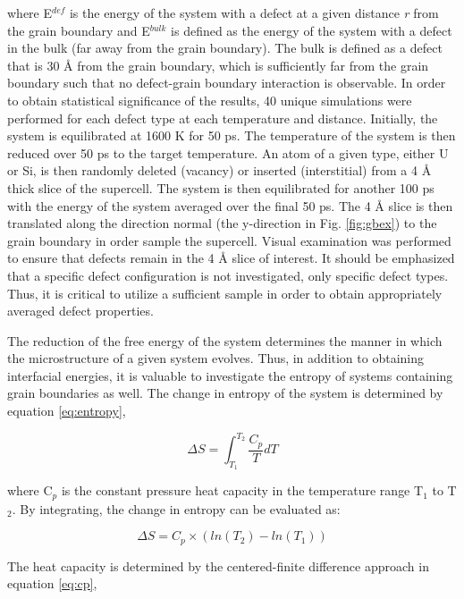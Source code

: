 \documentclass[review]{elsarticle}
\begin{document}
where E$^{def}$ is the energy of the system with a defect at a given distance \textit{r} from the grain boundary and E$^{bulk}$ is defined as the energy of the system with a defect in the bulk (far away from the grain boundary). The bulk is defined as a defect that is 30 {\AA} from the grain boundary, which is sufficiently far from the grain boundary such that no defect-grain boundary interaction is observable. In order to obtain statistical significance of the results, 40 unique simulations were performed for each defect type at each temperature and distance. Initially, the system is equilibrated at 1600 K for 50 ps. The temperature of the system is then reduced over 50 ps to the target temperature. An atom of a given type, either U or Si, is then randomly deleted (vacancy) or inserted (interstitial) from a 4 {\AA} thick slice of the supercell. The system is then equilibrated for another 100 ps with the energy of the system averaged over the final 50 ps. The 4 {\AA} slice is then translated along the direction normal (the y-direction in Fig. \ref{fig:gbex}) to the grain boundary in order sample the supercell. Visual examination was performed to ensure that defects remain in the 4 {\AA} slice of interest. It should be emphasized that a specific defect configuration is not investigated, only specific defect types. Thus, it is critical to utilize a sufficient sample in order to obtain appropriately averaged defect properties.

The reduction of the free energy of the system determines the manner in which the microstructure of a given system evolves. Thus, in addition to obtaining interfacial energies, it is valuable to investigate the entropy of systems containing grain boundaries as well. The change in entropy of the system is determined by equation \ref{eq:entropy},

\begin{equation}
\label{eq:entropy}
\Delta S = \int_{T_{1}}^{T_{2}} \frac{C_{p}}{T} dT
\end{equation}

where C$_{p}$ is the constant pressure heat capacity in the temperature range T$_{1}$ to T$_{2}$. By integrating, the change in entropy can be evaluated as:

\begin{equation}
\label{eq:entropy2}
\Delta S = C_{p} \times (ln(T_{2}) - ln(T_{1})) 
\end{equation}

The heat capacity is determined by the centered-finite difference approach in equation \ref{eq:cp},
\end{document}
